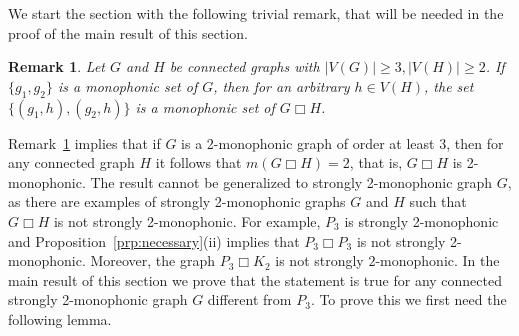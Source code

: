 \documentclass[a4paper,11pt]{article}
\newtheorem{remark}[theorem]{Remark}
\begin{document}
We start the section with the following trivial remark, that will be needed in the proof of the main result of this section.

\begin{remark}\label{r:cartesian}
    Let $G$ and $H$ be connected graphs with $|V(G)| \geq 3, |V(H)|\geq 2$. If $\{g_1,g_2\}$ is a monophonic set of $G$, then for an arbitrary $h \in V(H)$, the set $\{(g_1,h),(g_2,h)\}$ is a monophonic set of $G\Box H$. 
\end{remark}

Remark~\ref{r:cartesian} implies that if $G$ is a 2-monophonic graph of order at least 3, then for any connected graph $H$ it follows that $m(G \Box H)=2$, that is, $G \Box H$ is 2-monophonic. The result cannot be generalized to strongly 2-monophonic graph $G$, as there are examples of strongly 2-monophonic graphs $G$ and $H$ such that $G \Box H$ is not strongly 2-monophonic. For example, $P_3$ is strongly 2-monophonic and Proposition~\ref{prp:necessary}(ii) implies that $P_3 \Box P_3$ is not strongly 2-monophonic. Moreover, the graph $P_3\Box K_2$ is not strongly $2$-monophonic.
In the main result of this section we prove that the statement is true for any connected strongly 2-monophonic graph $G$ different from $P_3$. To prove this we first need the following lemma.
\end{document}
